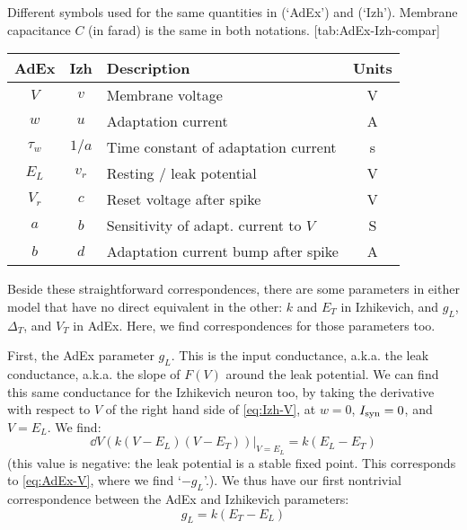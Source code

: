 \begin{table}[h]
    \begin{sidecaption}
        {Different symbols used for the same quantities in \cite{Naud2008FiringPatternsAdaptive} (`AdEx') and \cite{Izhikevich2007DynamicalSystemsNeuroscience} (`Izh').
        Membrane capacitance $C$ (in farad) is the same in both notations.}
        [tab:AdEx-Izh-compar]
        \begin{tabular}{c c l c}
            AdEx   & Izh  & Description & Units \\
            \hline
            $V$  & $v$   & Membrane voltage & V \\
            $w$  & $u$   & Adaptation current & A \\
            $τ_w$  & $1/a$   & Time constant of adaptation current & s \\
            $E_L$  & $v_r$  & Resting / leak potential & V \\
            $V_r$  & $c$  & Reset voltage after spike & V \\
            $a$  & $b$ & Sensitivity of adapt. current to $V$ & S \\
            $b$  & $d$ & Adaptation current bump after spike & A \\
        \end{tabular}
    \end{sidecaption}
\end{table}

Beside these straightforward correspondences, there are some parameters in either model that have no direct equivalent in the other: $k$ and $E_T$ in Izhikevich, and $g_L$, $Δ_T$, and $V_T$ in AdEx.
Here, we find correspondences for those parameters too.

First, the AdEx parameter $g_L$. This is the input conductance, a.k.a. the leak conductance, a.k.a. the slope of $F(V)$ around the leak potential. We can find this same conductance for the Izhikevich neuron too, by taking the derivative with respect to $V$ of the right hand side of \cref{eq:Izh-V}, at $w = 0$, $I_{\text{syn}} = 0$, and $V = E_L$. We find:
\begin{equation}
    \dd{V}(k(V-E_L)(V-E_T)) \Big|_{V=E_L} = k(E_L - E_T)
\end{equation}
(this value is negative: the leak potential is a stable fixed point. This corresponds to \cref{eq:AdEx-V}, where we find `$-g_L$'.).
We thus have our first nontrivial correspondence between the AdEx and Izhikevich parameters:
\begin{equation}
    g_L = k (E_T - E_L)
\end{equation}

